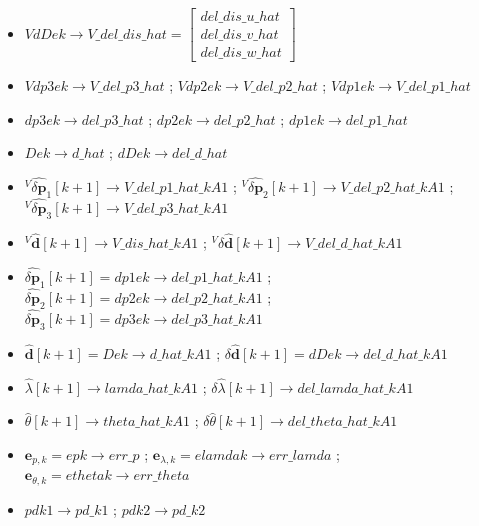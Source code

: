 \documentclass[UTF8,12pt,a4paper]{ctexart}
\begin{document}
\begin{itemize}[itemsep=6pt]
\item $VdDek \to V\_del\_dis\_hat = \begin{bmatrix} del\_dis\_u\_hat \\ del\_dis\_v\_hat \\ del\_dis\_w\_hat \end{bmatrix}$

\item $Vdp3ek \to V\_del\_p3\_hat$ \;;\; $Vdp2ek \to V\_del\_p2\_hat$ \;;\; $Vdp1ek \to V\_del\_p1\_hat$

\item $dp3ek \to del\_p3\_hat$ \;;\; $dp2ek \to del\_p2\_hat$ \;;\; $dp1ek \to del\_p1\_hat$

\item $Dek \to d\_hat$ \;;\; $dDek \to del\_d\_hat$

\item ${}^V\!\hat{\delta\mathbf{p}}_1[k\!+\!1] \to V\_del\_p1\_hat\_kA1$ \;;\;
${}^V\!\hat{\delta\mathbf{p}}_2[k\!+\!1] \to V\_del\_p2\_hat\_kA1$ \;;\;
${}^V\!\hat{\delta\mathbf{p}}_3[k\!+\!1] \to V\_del\_p3\_hat\_kA1$

\item ${}^V\!\hat{\mathbf{d}}[k+1] \to V\_dis\_hat\_kA1$ \;;\;
${}^V\!\delta\hat{\mathbf{d}}[k+1] \to V\_del\_d\_hat\_kA1$

\item $\hat{\delta\mathbf{p}}_1[k\!+\!1] = dp1ek \to del\_p1\_hat\_kA1$ \;;\;
$\hat{\delta\mathbf{p}}_2[k\!+\!1] = dp2ek \to del\_p2\_hat\_kA1$ \;;\;
$\hat{\delta\mathbf{p}}_3[k\!+\!1] = dp3ek \to del\_p3\_hat\_kA1$

\item $\hat{\mathbf{d}}[k+1] = Dek \to d\_hat\_kA1$ \;;\;
$\delta\hat{\mathbf{d}}[k+1] = dDek \to del\_d\_hat\_kA1$

\item $\hat{\lambda}[k+1] \to lamda\_hat\_kA1$ \;;\;
$\delta\hat{\lambda}[k+1] \to del\_lamda\_hat\_kA1$

\item $\hat{\theta}[k+1] \to theta\_hat\_kA1$ \;;\;
$\delta\hat{\theta}[k+1] \to del\_theta\_hat\_kA1$

\item $\mathbf{e}_{p,k} = epk \to err\_p$ \;;\;
$\mathbf{e}_{\lambda,k} = elamdak \to err\_lamda$ \;;\;
$\mathbf{e}_{\theta,k} = ethetak \to err\_theta$

\item $pdk1 \to pd\_k1$ \;;\; $pdk2 \to pd\_k2$



\end{itemize}
\end{document}
